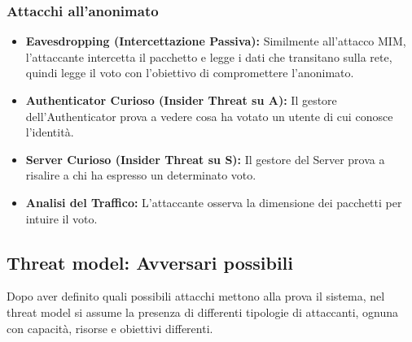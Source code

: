 	\subsubsection{Attacchi all'anonimato}
		\begin{itemize}
			\item \textbf{Eavesdropping (Intercettazione Passiva):}
			Similmente all'attacco MIM, l'attaccante intercetta il pacchetto e legge i dati che transitano sulla rete, quindi legge il voto con l'obiettivo di compromettere l'anonimato.

			\item \textbf{Authenticator Curioso (Insider Threat su A):} Il gestore dell'Authenticator prova a vedere cosa ha votato un utente di cui conosce l'identità.

			\item \textbf{Server Curioso (Insider Threat su S):} Il gestore del Server prova a risalire a chi ha espresso un determinato voto.

			\item \textbf{Analisi del Traffico:} L'attaccante osserva la dimensione dei pacchetti per intuire il voto.
		\end{itemize}

\subsection{Threat model: Avversari possibili}
	Dopo aver definito quali possibili attacchi mettono alla prova il sistema, nel threat model si assume la presenza di differenti tipologie di attaccanti, ognuna con capacità, risorse e obiettivi differenti.
	
